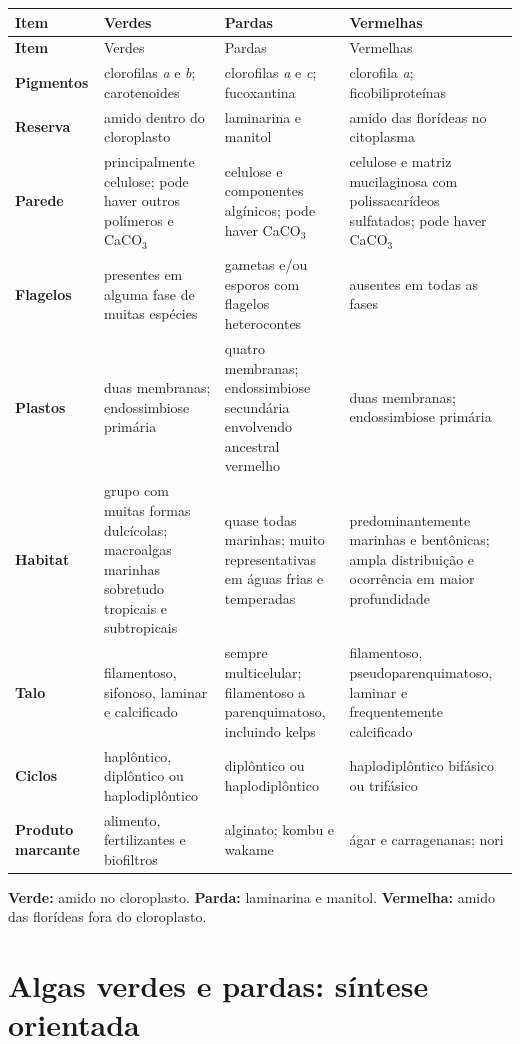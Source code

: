 \documentclass[12pt,a4paper]{article}
\begin{document}
\begin{longtable}{>{\bfseries}p{}p{}p{}p{}}
\toprule
Item & Verdes & Pardas & Vermelhas\\
\midrule
\endfirsthead
\toprule
Item & Verdes & Pardas & Vermelhas\\
\midrule
\endhead
Pigmentos & clorofilas \textit{a} e \textit{b}; carotenoides & clorofilas
\textit{a} e \textit{c}; fucoxantina & clorofila \textit{a};
ficobiliproteínas\\
Reserva & amido dentro do cloroplasto & laminarina e manitol & amido das
florídeas no citoplasma\\
Parede & principalmente celulose; pode haver outros polímeros e CaCO$_3$ &
celulose e componentes algínicos; pode haver CaCO$_3$ & celulose e matriz
mucilaginosa com polissacarídeos sulfatados; pode haver CaCO$_3$\\
Flagelos & presentes em alguma fase de muitas espécies & gametas e/ou esporos
com flagelos heterocontes & ausentes em todas as fases\\
Plastos & duas membranas; endossimbiose primária & quatro membranas;
endossimbiose secundária envolvendo ancestral vermelho & duas membranas;
endossimbiose primária\\
Habitat & grupo com muitas formas dulcícolas; macroalgas marinhas sobretudo
tropicais e subtropicais & quase todas marinhas; muito representativas em águas
frias e temperadas & predominantemente marinhas e bentônicas; ampla distribuição
e ocorrência em maior profundidade\\
Talo & filamentoso, sifonoso, laminar e calcificado & sempre multicelular;
filamentoso a parenquimatoso, incluindo kelps & filamentoso,
pseudoparenquimatoso, laminar e frequentemente calcificado\\
Ciclos & haplôntico, diplôntico ou haplodiplôntico & diplôntico ou
haplodiplôntico & haplodiplôntico bifásico ou trifásico\\
Produto marcante & alimento, fertilizantes e biofiltros & alginato; kombu e
wakame & ágar e carragenanas; nori\\
\bottomrule
\end{longtable}

\begin{essencial}
\textbf{Verde:} amido no cloroplasto. \textbf{Parda:} laminarina e manitol.
\textbf{Vermelha:} amido das florídeas fora do cloroplasto.
\end{essencial}

\section{Algas verdes e pardas: síntese orientada}
\end{document}
